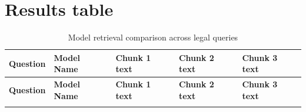 \documentclass[11pt]{article}
\begin{document}
\appendix
\section{Results table}
\label{table}
\setlength{\tabcolsep}{3pt}
\renewcommand{\arraystretch}{1.15}

\begin{xltabular}{\textwidth}{|p{3.2cm}|p{2.2cm}|Y|Y|Y|}
\caption{Model retrieval comparison across legal queries}\label{tab:model_retrievals}\\
\hline
\textbf{Question} & \textbf{Model Name} & \textbf{Chunk 1 text} & \textbf{Chunk 2 text} & \textbf{Chunk 3 text} \\
\hline
\endfirsthead

\hline
\textbf{Question} & \textbf{Model Name} & \textbf{Chunk 1 text} & \textbf{Chunk 2 text} & \textbf{Chunk 3 text} \\
\hline
\endhead

\hline
\endfoot

\hline
\endlastfoot

\endlastfoot



\end{xltabular}
\end{document}
